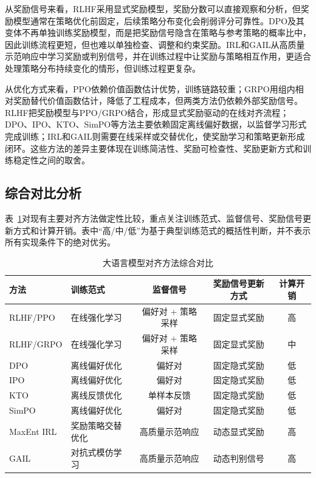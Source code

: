 从奖励信号来看，RLHF采用显式奖励模型，奖励分数可以直接观察和分析，但奖励模型通常在策略优化前固定，后续策略分布变化会削弱评分可靠性。DPO及其变体不再单独训练奖励模型，而是把奖励信号隐含在策略与参考策略的概率比中，因此训练流程更短，但也难以单独检查、调整和约束奖励。IRL和GAIL从高质量示范响应中学习奖励或判别信号，并在训练过程中让奖励与策略相互作用，更适合处理策略分布持续变化的情形，但训练过程更复杂。

从优化方式来看，PPO依赖价值函数估计优势，训练链路较重；GRPO用组内相对奖励替代价值函数估计，降低了工程成本，但两类方法仍依赖外部奖励信号。RLHF把奖励模型与PPO/GRPO结合，形成显式奖励驱动的在线对齐流程；DPO、IPO、KTO、SimPO等方法主要依赖固定离线偏好数据，以监督学习形式完成训练；IRL和GAIL则需要在线采样或交替优化，使奖励学习和策略更新形成闭环。这些方法的差异主要体现在训练简洁性、奖励可检查性、奖励更新方式和训练稳定性之间的取舍。

\subsection{综合对比分析}

表~\ref{tab:method_comparison}对现有主要对齐方法做定性比较，重点关注训练范式、监督信号、奖励信号更新方式和计算开销。表中“高/中/低”为基于典型训练范式的概括性判断，并不表示所有实现条件下的绝对优劣。

\begin{table}[htbp]
    \centering
    \caption{大语言模型对齐方法综合对比}
    \label{tab:method_comparison}
    \small
    \setlength{\tabcolsep}{5pt}
    \renewcommand{\arraystretch}{1.3}
    \begin{tabularx}{\textwidth}{l >{\raggedright\arraybackslash}X c c c}
        \toprule
        \textbf{方法} & \textbf{训练范式} & \textbf{监督信号} & \textbf{奖励信号更新方式} & \textbf{计算开销} \\
        \midrule
        RLHF/PPO   & 在线强化学习 & 偏好对 + 策略采样 & 固定显式奖励 & 高 \\
        RLHF/GRPO  & 在线强化学习 & 偏好对 + 策略采样 & 固定显式奖励 & 中 \\
        DPO        & 离线偏好优化 & 偏好对 & 固定隐式奖励 & 低 \\
        IPO        & 离线偏好优化 & 偏好对 & 固定隐式奖励 & 低 \\
        KTO        & 离线反馈优化 & 单样本反馈 & 固定隐式奖励 & 低 \\
        SimPO      & 离线偏好优化 & 偏好对 & 固定隐式奖励 & 低 \\
        MaxEnt IRL & 奖励策略交替优化 & 高质量示范响应 & 动态显式奖励 & 高 \\
        GAIL       & 对抗式模仿学习 & 高质量示范响应 & 动态判别信号 & 高 \\
        \bottomrule
    \end{tabularx}
\end{table}

